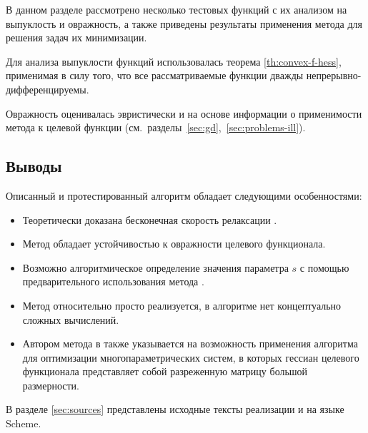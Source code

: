 В данном разделе рассмотрено несколько тестовых функций с их анализом
на выпуклость и овражность, а также приведены результаты применения
метода \relch{} для решения задач их минимизации. 

Для анализа выпуклости функций использовалась теорема
\ref{th:convex-f-hess}, применимая в силу того, что все
рассматриваемые функции дважды непрерывно-дифференцируемы.

Овражность оценивалась эвристически и на основе информации о
применимости метода \gd{} к целевой функции
(см. разделы \ref{sec:gd}, \ref{sec:problems-ill}).




\clearpage


\clearpage


\clearpage


\subsection{Выводы}

Описанный и протестированный алгоритм \relch{} обладает следующими
особенностями:
\begin{itemize}
\item Теоретически доказана бесконечная скорость релаксации \relch{}.
\item Метод \relch{} обладает устойчивостью к овражности целевого
  функционала.
\item Возможно алгоритмическое определение значения параметра $s$ с
  помощью предварительного использования метода \gd{}.
\item Метод относительно просто реализуется, в алгоритме нет
  концептуально сложных вычислений.
\item Автором метода в \cite{chernorutsky04} также указывается на
  возможность применения алгоритма для оптимизации
  многопараметрических систем, в которых гессиан целевого функционала
  представляет собой разреженную матрицу большой размерности.
\end{itemize}

В разделе \ref{sec:sources} представлены исходные тексты реализации
\relch{} и \gdrelch{} на языке Scheme.
